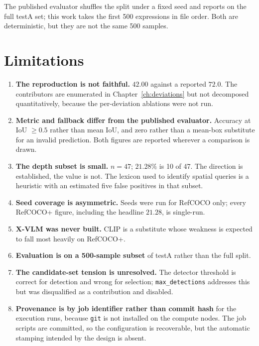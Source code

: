 \documentclass[12pt,a4paper,oneside]{report}
\begin{document}
The published evaluator shuffles the split under a fixed seed and reports on the full
testA set; this work takes the first 500 expressions in file order. Both are
deterministic, but they are not the same 500 samples.

\chapter{Limitations}
\label{ch:limitations}

\begin{enumerate}[leftmargin=1.6em, itemsep=4pt]
\item \textbf{The reproduction is not faithful.} $42.00$ against a reported $72.0$. The
contributors are enumerated in Chapter~\ref{ch:deviations} but not decomposed
quantitatively, because the per-deviation ablations were not run.

\item \textbf{Metric and fallback differ from the published evaluator.} Accuracy at
IoU $\geq 0.5$ rather than mean IoU, and zero rather than a mean-box substitute for an
invalid prediction. Both figures are reported wherever a comparison is drawn.

\item \textbf{The depth subset is small.} $n = 47$; $21.28\%$ is 10 of 47. The direction
is established, the value is not. The lexicon used to identify spatial queries is a
heuristic with an estimated five false positives in that subset.

\item \textbf{Seed coverage is asymmetric.} Seeds were run for RefCOCO only; every
RefCOCO+ figure, including the headline $21.28$, is single-run.

\item \textbf{X-VLM was never built.} CLIP is a substitute whose weakness is expected to
fall most heavily on RefCOCO+.

\item \textbf{Evaluation is on a 500-sample subset} of testA rather than the full split.

\item \textbf{The candidate-set tension is unresolved.} The detector threshold is correct
for detection and wrong for selection; \texttt{max\_detections} addresses this but was
disqualified as a contribution and disabled.

\item \textbf{Provenance is by job identifier rather than commit hash} for the execution
runs, because \texttt{git} is not installed on the compute nodes. The job scripts are
committed, so the configuration is recoverable, but the automatic stamping intended by
the design is absent.
\end{enumerate}
\end{document}
